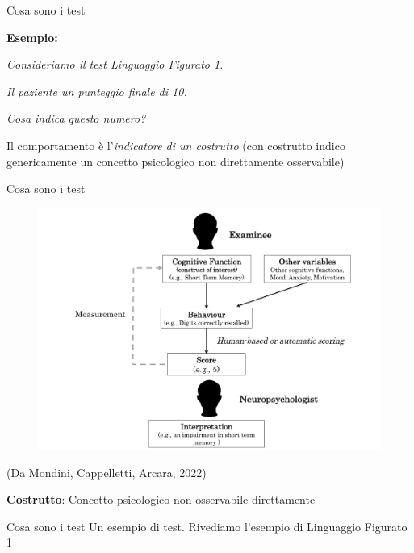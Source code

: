 \documentclass[
  ignorenonframetext,
]{beamer}
\begin{document}
\begin{frame}{Cosa sono i test}
\label{cosa-sono-i-test-2}
\begin{center}
  \textbf{Esempio:}
\end{center}
\vspace{2em}

\emph{Consideriamo il test Linguaggio Figurato 1.}

\emph{Il paziente un punteggio finale di 10.}

\emph{Cosa indica questo numero?} \pause \vspace{2em}

Il comportamento è l'\emph{indicatore di un costrutto} (con costrutto
indico genericamente un concetto psicologico non direttamente
osservabile)
\end{frame}

\begin{frame}{Cosa sono i test}
\label{cosa-sono-i-test-3}
\begin{figure}
  \includegraphics[scale=0.3]{Figures/measurement_diagramma.png}
\end{figure}

\begin{flushright}
  (Da Mondini, Cappelletti, Arcara, 2022)
\end{flushright}

\textbf{Costrutto}: Concetto psicologico non osservabile direttamente
\end{frame}

\begin{frame}{Cosa sono i test}
\label{cosa-sono-i-test-4}
Un esempio di test. Rivediamo l'esempio di Linguaggio Figurato 1
\end{frame}
\end{document}
